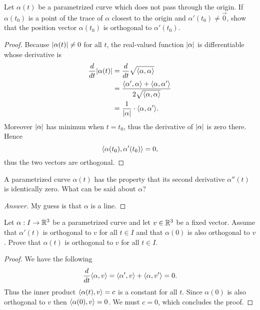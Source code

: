 \documentclass{article}
\begin{document}
\noindent\hrulefill
\begin{exercise}
  Let $\alpha(t)$ be a parametrized curve which does not pass through the origin.
  If $\alpha(t_0)$ is a point of the trace of $\alpha$ closest to the origin and
  $\alpha'(t_0)\neq\vec{0}$, show that the position vector $\alpha(t_0)$
  is orthogonal to $\alpha'(t_0)$.
\end{exercise}
\noindent\hrulefill
\begin{proof}
  Because $\lvert\alpha(t)\rvert\neq 0$ for all $t$,
  the real-valued function $\lvert\alpha\rvert$ is differentiable whose derivative is
  \begin{align*}
    \frac{d}{dt}\lvert\alpha(t)\rvert
    &= \frac{d}{dt}\sqrt{\langle\alpha, \alpha\rangle}\\
    &= \frac{\langle\alpha',\alpha\rangle+\langle\alpha,\alpha'\rangle}{2\sqrt{\langle\alpha,\alpha\rangle}}\\
    &= \frac1{\lvert\alpha\rvert}\cdot\langle\alpha,\alpha'\rangle.
  \end{align*}
  Moreover $\lvert\alpha\rvert$ has minimun when $t=t_0$, thus the derivative of $\lvert\alpha\rvert$
  is zero there. Hence
  \[\langle\alpha(t_0), \alpha'(t_0)\rangle=0,\]
  thus the two vectors are orthogonal.
\end{proof}

\noindent\hrulefill
\begin{exercise}
  A parametrized curve $\alpha(t)$ has the property that its second derivative
  $\alpha''(t)$ is identically zero. What can be said about $\alpha$?
\end{exercise}
\noindent\hrulefill
\begin{proof}[Answer]
  My guess is that $\alpha$ is a line.
\end{proof}

\noindent\hrulefill
\begin{exercise}
  Let $\alpha:I\to\mathbb{R}^3$ be a parametrized curve and let $v\in\mathbb{R}^3$ be a fixed
  vector. Assume that $\alpha'(t)$ is orthogonal to $v$ for all $t\in I$ and
  that $\alpha(0)$ is also orthogonal to $v$. Prove that $\alpha(t)$ is
  orthogonal to $v$ for all $t\in I$.
\end{exercise}
\noindent\hrulefill
\begin{proof}
  We have the following
  \[\frac{d}{dt}\langle\alpha, v\rangle = \langle\alpha',v\rangle+\langle\alpha,v'\rangle=0. \]
  Thus the inner product $\langle\alpha(t), v\rangle=c$ is a constant for all $t$.
  Since $\alpha(0)$ is also orthogonal to $v$ then $\langle\alpha(0), v\rangle=0$.
  We must $c=0$, which concludes the proof.
\end{proof}
\end{document}

